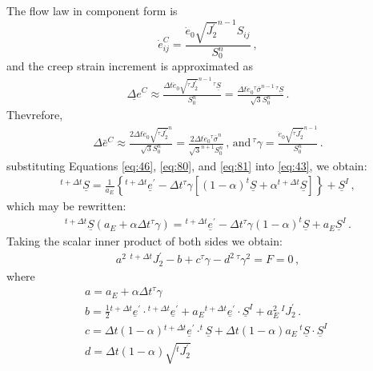 The flow law in component form is 
\begin{equation}
\dot{e}_{ij}^{C}=\frac{\dot{e}_{0}\sqrt{J_{2}^{\prime}}^{n-1}S_{ij}}{S_{0}^{n}}\:,\label{eq:79}
\end{equation}
and the creep strain increment is approximated as
\begin{gather}
\underline{\Delta e}^{C}\approx\frac{\Delta t\dot{e}_{0}\sqrt{^{\tau}J_{2}^{\prime}}^{n-1}\,^{\tau}\underline{S}}{S_{0}^{n}}=\frac{\Delta t\dot{e}_{0}\phantom{}^{\tau}\overline{\sigma}^{n-1}\,^{\tau}\underline{S}}{\sqrt{3}S_{0}^{n}}\,.\label{eq:80}
\end{gather}
 Thevrefore,
\begin{gather}
\Delta\bar{e}^{C}\approx\frac{2\Delta t\dot{e}_{0}\sqrt{^{\tau}J_{2}^{\prime}}^{n}}{\sqrt{3}S_{0}^{n}}=\frac{2\Delta t\dot{e}_{0}\phantom{}^{\tau}\overline{\sigma}^{n}}{\sqrt{3}^{n+1}S_{0}^{n}}\,,\,\textrm{and}\,^{\tau}\gamma=\frac{\dot{e}_{0}\sqrt{^{\tau}J_{2}^{\prime}}^{n-1}}{S_{0}^{n}}\,.\label{eq:81}
\end{gather}
substituting Equations \vref{eq:46}, \vref{eq:80}, and \vref{eq:81}
into \vref{eq:43}, we obtain:
\begin{gather}
^{t+\Delta t}\underline{S}=\frac{1}{a_{E}}\left\{ ^{t+\Delta t}\underline{e}^{\prime}-\Delta t\phantom{}^{\tau}\gamma\left[\left(1-\alpha\right)^{t}\underline{S}+\alpha{}^{t+\Delta t}\underline{S}\right]\right\} +\underline{S}^{I}\,,\label{eq:82}
\end{gather}
which may be rewritten:
\begin{gather}
^{t+\Delta t}\underline{S}\left(a_{E}+\alpha\Delta t\phantom{}^{\tau}\gamma\right)={}^{t+\Delta t}\underline{e}^{\prime}-\Delta t\phantom{}^{\tau}\gamma\left(1-\alpha\right)^{t}\underline{S}+a_{E}\underline{S}^{I}\,.\label{eq:83}
\end{gather}
Taking the scalar inner product of both sides we obtain:
\begin{gather}
a^{2}\,\,{}^{t+\Delta t}J_{2}^{\prime}-b+c\phantom{}^{\tau}\gamma-d^{2}\,^{\tau}\gamma^{2}=F=0\,,\label{eq:84}
\end{gather}
where
\begin{gather}
a=a_{E}+\alpha\Delta t\phantom{}^{\tau}\gamma\,\,\nonumber \\
b=\frac{1}{2}{}^{t+\Delta t}\underline{e}^{\prime}\cdot{}^{t+\Delta t}\underline{e}^{\prime}+a_{E}{}^{t+\Delta t}\underline{e}^{\prime}\cdot\underline{S}^{I}+a_{E}^{2}\,^{I}J_{2}^{\prime}\,.\label{eq:85}\\
c=\Delta t\left(1-\alpha\right){}^{t+\Delta t}\underline{e}^{\prime}\cdot^{t}\underline{S}+\Delta t\left(1-\alpha\right)a_{E}\,^{t}\underline{S}\cdot\underline{S}^{I}\,\,\nonumber \\
d=\Delta t\left(1-\alpha\right)\sqrt{^{t}J_{2}^{\prime}}\,\,\nonumber 
\end{gather}
